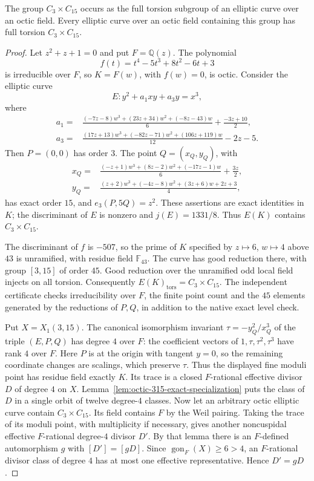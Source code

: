 

\begin{proposition}\label{prop:octic-315-complete}
The group $C_3\times C_{15}$ occurs as the full torsion subgroup
of an elliptic curve over an octic field. Every elliptic curve over
an octic field containing this group has full torsion $C_3\times C_{15}$.
\end{proposition}
\begin{proof}
Let $z^2+z+1=0$ and put $F=\mathbb Q(z)$.
The polynomial
\[
 f(t)=t^4-5t^3+8t^2-6t+3
\]
is irreducible over $F$, so $K=F(w)$, with $f(w)=0$, is octic.
Consider the elliptic curve
\[
 E:y^2+a_1xy+a_3y=x^3,
\]
where
\[
\begin{split}
 a_1={}&\frac{(-7z-8)w^3+(23z+34)w^2+(-8z-43)w}{6}
                         +\frac{-3z+10}{2},\\
 a_3={}&\frac{(17z+13)w^3+(-82z-71)w^2+(106z+119)w}{12}
                         -2z-5.
\end{split}
\]
Then $P=(0,0)$ has order $3$. The point $Q=(x_Q,y_Q)$, with
\[
\begin{split}
 x_Q={}&\frac{(-z+1)w^3+(8z-2)w^2+(-17z-1)w}{6}
                              +\frac{3z}{2},\\
 y_Q={}&\frac{(z+2)w^3+(-4z-8)w^2+(3z+6)w+2z+3}{4},
\end{split}
\]
has exact order $15$, and $e_3(P,5Q)=z^2$.
These assertions are exact identities in $K$;
the discriminant of $E$ is nonzero and $j(E)=1331/8$.
Thus $E(K)$ contains $C_3\times C_{15}$.

The discriminant of $f$ is $-507$, so the prime of $K$ specified
by $z\mapsto6$, $w\mapsto4$ above $43$ is unramified, with
residue field $\mathbb F_{43}$. The curve has good reduction
there, with group $[3,15]$ of order $45$. Good reduction over
the unramified odd local field injects on all torsion.
Consequently $E(K)_{\mathrm{tors}}=C_3\times C_{15}$.
The independent certificate checks irreducibility over $F$,
the finite point count and the $45$ elements generated by the
reductions of $P,Q$, in addition to the native exact level check.

Put $X=X_1(3,15)$. The canonical isomorphism invariant $\tau=-y_Q^2/x_Q^3$ of
the triple $(E,P,Q)$ has degree $4$ over $F$: the coefficient
vectors of $1,\tau,\tau^2,\tau^3$ have rank $4$ over $F$.
Here $P$ is at the origin with tangent $y=0$, so the remaining
coordinate changes are scalings, which preserve $\tau$. Thus the displayed fine
moduli point has residue field exactly $K$. Its trace is a
closed $F$-rational effective divisor $D$ of degree $4$ on $X$.
Lemma~\ref{lem:octic-315-exact-specialization} puts the class
of $D$ in a single orbit of twelve degree-$4$ classes.
Now let an arbitrary octic elliptic curve contain $C_3\times C_{15}$.
Its field contains $F$ by the Weil pairing. Taking the trace of
its moduli point, with multiplicity if necessary, gives another
noncuspidal effective $F$-rational degree-$4$ divisor $D'$.
By that lemma there is an $F$-defined automorphism $g$ with
$[D']=[gD]$. Since $\operatorname{gon}_F(X)\geq6>4$, an
$F$-rational divisor class of degree $4$ has at most one effective
representative. Hence $D'=gD$.


\end{proof}

